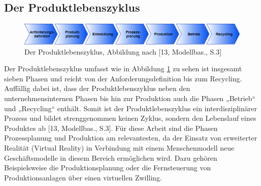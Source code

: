 \subsection{Der Produktlebenszyklus}\label{sec:Produktlebenszyklus}
\begin{figure}[h]
	\centering
	\includegraphics[width=1\linewidth]{Bilder/A8_Produktlebenszyklus}
	\caption{Der Produktlebenszyklus, Abbildung nach [13, Modellbas., S.3]}
	\label{fig:Produktlebenszyklus}
\end{figure}
\noindent Der Produktlebenszyklus umfasst wie in Abbildung \ref{fig:Produktlebenszyklus} zu sehen ist insgesamt sieben Phasen und reicht von der Anforderungsdefinition bis zum Recycling. Auffällig dabei ist, dass der Produktlebenszyklus neben den unternehmensinternen Phasen bis hin zur Produktion auch die Phasen „Betrieb“ und „Recycling“ enthält. Somit ist der Produktlebenszyklus ein interdisziplinärer Prozess und bildet strenggenommen keinen Zyklus, sondern den Lebenslauf eines Produktes ab [13, Modellbas., S.3].
\newline\newline
Für diese Arbeit sind die Phasen Prozessplanung und Produktion am relevantesten, da der Einsatz von erweiterter Realität (Virtual Reality) in Verbindung mit einem Menschenmodell neue Geschäftsmodelle in diesem Bereich ermöglichen wird. Dazu gehören Beispielsweise die Produktionsplanung oder die Fernsteuerung von Produktionsanlagen über einen virtuellen Zwilling.

